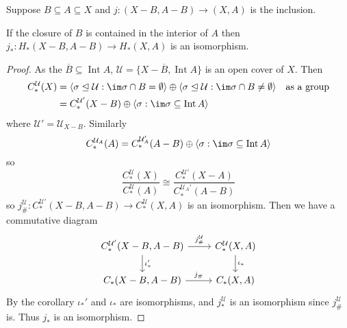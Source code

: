 \documentclass[a4paper]{article}
\DeclareMathOperator{\Int}{Int} %
\begin{document}
Suppose \(B \subseteq A \subseteq X\) and \(j: (X - B, A - B) \to (X, A)\) is the inclusion.

\begin{theorem}[excision]
  If the closure of \(B\) is contained in the interior of \(A\) then \(j_*: H_*(X - B, A - B) \to H_*(X, A)\) is an isomorphism.
\end{theorem}

\begin{proof}
  As the \(\overline B \subseteq \Int A\), \(\mathcal U = \{X - \overline B, \Int A\}\) is an open cover of \(X\). Then
  \begin{align*}
    C_*^{\mathcal U} (X)
    &= \langle \sigma \trianglelefteq \mathcal U: \im \sigma \cap B = \emptyset \rangle
    \oplus \langle \sigma \trianglelefteq \mathcal U: \im \sigma \cap B \ne \emptyset \rangle \quad \text{as a group} \\
    &= C_*^{\mathcal U'}(X - B) \oplus \langle \sigma: \im \sigma \subseteq \Int A \rangle
  \end{align*}
  where \(\mathcal U' = \mathcal U_{X - B}\). Similarly
  \[
    C_*^{\mathcal U_A}(A) = C_*^{\mathcal U_A'}(A - B) \oplus \langle \sigma: \im \sigma \subseteq \Int A \rangle
  \]
  so
  \[
    \frac{C_*^{\mathcal U}(X)}{C_*^{\mathcal U}(A)} \cong \frac{C_*^{\mathcal U'}(X - A)}{C_*^{\mathcal U_A'}(A - B)}
  \]
  so \(j_\#^{\mathcal U}: C_*^{\mathcal U'}(X - B, A - B) \to C_*^{\mathcal U}(X, A)\) is an isomorphism. Then we have a commutative diagram
  \[
    \begin{tikzcd}
      C_*^{\mathcal U'}(X - B, A - B) \ar[r, "j_\#^{\mathcal U}"] \ar[d, "\iota_*'"] & C_*^{\mathcal U}(X, A) \ar[d, "\iota_*"] \\
      C_*(X - B, A - B) \ar[r, "j_\#"] & C_*(X, A)
    \end{tikzcd}
  \]
  By the corollary \(\iota_*'\) and \(\iota_*\) are isomorphisms, and \(j^{\mathcal U}_*\) is an isomorphism since \(j^{\mathcal U}_\#\) is. Thus \(j_*\) is an isomorphism.
\end{proof}
\end{document}
